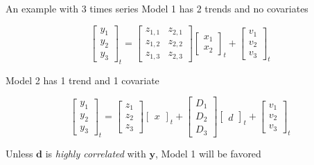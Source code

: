 \documentclass[
  ignorenonframetext,
]{beamer}
\begin{document}
\begin{frame}{An example with 3 times series}
\protect\hypertarget{an-example-with-3-times-series-1}{}
Model 1 has 2 trends and no covariates

\[
\begin{bmatrix}
 y_1 \\
 y_2 \\
 y_3 
\end{bmatrix}_t =
\begin{bmatrix}
 z_{1,1} & z_{2,1} \\
 z_{1,2} & z_{2,2} \\
 z_{1,3} & z_{2,3}
\end{bmatrix}
\begin{bmatrix}
 x_1 \\
 x_2 
\end{bmatrix}_t +
\begin{bmatrix}
 v_1 \\
 v_2 \\
 v_3 
\end{bmatrix}_t
\]

Model 2 has 1 trend and 1 covariate

\[
\begin{bmatrix}
 y_1 \\
 y_2 \\
 y_3 
\end{bmatrix}_t =
\begin{bmatrix}
 z_1 \\
 z_2 \\
 z_3 
\end{bmatrix}
\begin{bmatrix}
 x
\end{bmatrix}_t +
\begin{bmatrix}
 D_1 \\
 D_2 \\
 D_3 
\end{bmatrix}
\begin{bmatrix}
 d
\end{bmatrix}_t +
\begin{bmatrix}
 v_1 \\
 v_2 \\
 v_3 
\end{bmatrix}_t
\]

Unless \(\mathbf{d}\) is \emph{highly correlated} with \(\mathbf{y}\),
Model 1 will be favored
\end{frame}
\end{document}
